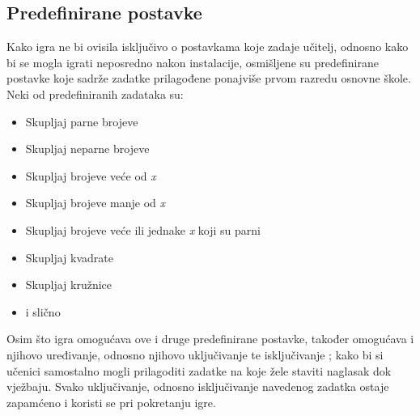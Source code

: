 \documentclass[times, utf8, zavrsni, numeric]{fer}
\begin{document}
		\subsection{Predefinirane postavke}
		Kako igra ne bi ovisila isključivo o postavkama koje zadaje učitelj, odnosno kako bi se mogla igrati neposredno nakon instalacije, osmišljene su predefinirane postavke koje sadrže zadatke prilagođene ponajviše prvom razredu osnovne škole.
		Neki od predefiniranih zadataka su: 
			\begin{itemize}
				\item  {Skupljaj parne brojeve}
				\item  {Skupljaj neparne brojeve}
				\item  {Skupljaj brojeve veće od \textit{x}}
				\item  {Skupljaj brojeve manje od \textit{x}}
				\item  {Skupljaj brojeve veće ili jednake \textit{x} koji su parni }
				\item  {Skupljaj kvadrate}
				\item  {Skupljaj kružnice}
				\item {i slično}
			\end{itemize}
		Osim što igra omogućava ove i druge predefinirane postavke, također omogućava i njihovo uređivanje, odnosno njihovo uključivanje te isključivanje \cite{customview}; kako bi si učenici samostalno mogli prilagoditi zadatke na koje žele staviti naglasak dok vježbaju.
		Svako uključivanje, odnosno isključivanje navedenog zadatka ostaje zapamćeno i koristi se pri pokretanju igre.
		
\end{document}
